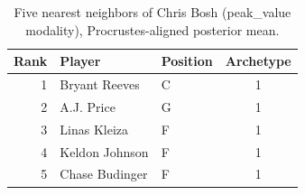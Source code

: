 \begin{table}[htbp]
  \centering\small
  \begin{tabular}{rllc}
    \toprule
    Rank & Player & Position & Archetype \\
    \midrule
    1 & Bryant Reeves & C & 1 \\
    2 & A.J. Price & G & 1 \\
    3 & Linas Kleiza & F & 1 \\
    4 & Keldon Johnson & F & 1 \\
    5 & Chase Budinger & F & 1 \\
    \bottomrule
  \end{tabular}
  \caption{Five nearest neighbors of Chris Bosh (peak_value modality), Procrustes-aligned posterior mean.}
  \label{tab:Chris_Bosh_neighbors_peak_value}
\end{table}

